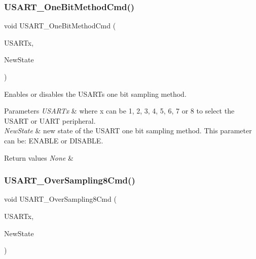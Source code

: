 \subsubsection{\texorpdfstring{U\+S\+A\+R\+T\+\_\+\+One\+Bit\+Method\+Cmd()}{USART\_OneBitMethodCmd()}}
{\footnotesize\ttfamily void U\+S\+A\+R\+T\+\_\+\+One\+Bit\+Method\+Cmd (\begin{DoxyParamCaption}\item[{U\+S\+A\+R\+T\+\_\+\+Type\+Def $\ast$}]{U\+S\+A\+R\+Tx,  }\item[{Functional\+State}]{New\+State }\end{DoxyParamCaption})}



Enables or disables the U\+S\+A\+RT\textquotesingle{}s one bit sampling method. 


\begin{DoxyParams}{Parameters}
{\em U\+S\+A\+R\+Tx} & where x can be 1, 2, 3, 4, 5, 6, 7 or 8 to select the U\+S\+A\+RT or U\+A\+RT peripheral. \\
\hline
{\em New\+State} & new state of the U\+S\+A\+RT one bit sampling method. This parameter can be\+: E\+N\+A\+B\+LE or D\+I\+S\+A\+B\+LE. \\
\hline
\end{DoxyParams}

\begin{DoxyRetVals}{Return values}
{\em None} & \\
\hline
\end{DoxyRetVals}
\mbox{\label{group___u_s_a_r_t___group1_ga3897bab07491d9239f8a238a9a7cddea}} 
\subsubsection{\texorpdfstring{U\+S\+A\+R\+T\+\_\+\+Over\+Sampling8\+Cmd()}{USART\_OverSampling8Cmd()}}
{\footnotesize\ttfamily void U\+S\+A\+R\+T\+\_\+\+Over\+Sampling8\+Cmd (\begin{DoxyParamCaption}\item[{U\+S\+A\+R\+T\+\_\+\+Type\+Def $\ast$}]{U\+S\+A\+R\+Tx,  }\item[{Functional\+State}]{New\+State }\end{DoxyParamCaption})}



